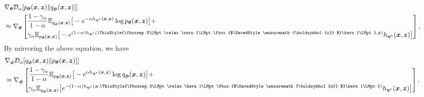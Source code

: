 \documentclass[letterpaper]{article} %
\newcommand{\bali}{\begin{aligned}}
\newcommand{\eali}{\end{aligned}}
\newcommand{\Dc}[0]{\ensuremath{\mathcal{D}} }
\newcommand{\Ebb}[0]{\ensuremath{\mathbb{E}} }
\newcommand{\xv}[0]{\ensuremath{\boldsymbol{x}} }
\newcommand{\zv}[0]{\ensuremath{\boldsymbol{z}} }
\newcommand{\etav}[0]{\ensuremath{\boldsymbol{\eta}} }
\newcommand{\thetav}[0]{\ensuremath{\boldsymbol{\theta}} }
\newcommand{\phiv}[0]{\ensuremath{\boldsymbol{\phi}} }
\newcommand\mathbox[1]{\mathord{\ThisStyle{%
			\fboxsep3\LMpt\relax\kern1\LMpt\fbox{$\SavedStyle#1$}\kern1\LMpt}}}
\begin{document}
\begin{equation}\label{eq:}
\begin{aligned}
    & \nabla_{\thetav} \Dc_{\alpha} [p_{\thetav}(\xv, \zv) \| q_{\phiv}(\xv,\zv)]]
    \\
    & \approx \nabla_{\thetav} \left[
    \bali
        & \frac{1 - \gamma_{\alpha}}{1 - \alpha} \Ebb_{q_{\phiv}(\xv,\zv)} \big[ -
        e^{- \alpha h_{\etav^{*}}(\xv, \zv)}
        \log p_{\thetav}(\xv, \zv)
        \big] + 
        \\
        & \gamma_{\alpha} \Ebb_{p_{\thetav}(\xv, \zv)} \big[-
        e^{(1 - \alpha) h_{\etav^{*}}(\mathbox{\xv}, \zv)}
        h_{\etav^{*}}(\xv, \zv) 
        \big]
    \eali
    \right],
\end{aligned}
\end{equation}
By mirroring the above equation, we have
\begin{equation}\label{eq:}
\begin{aligned}
    & \nabla_{\phiv} \Dc_{\alpha} [q_{\phiv}(\xv,\zv) \| p_{\thetav}(\xv, \zv)]]
    \\
    & \approx \nabla_{\phiv} \left[
    \bali
        & \frac{1 - \gamma_{\alpha}}{1 - \alpha} \Ebb_{p_{\thetav}(\xv, \zv)} \big[ -
        e^{ \alpha h_{\etav^{*}}(\xv, \zv)}
        \log q_{\phiv}(\xv,\zv)
        \big] + 
        \\
        & \gamma_{\alpha} \Ebb_{q_{\phiv}(\xv,\zv)} \big[
        e^{-(1 - \alpha) h_{\etav^{*}}(\xv, \mathbox{\zv})}
        h_{\etav^{*}}(\xv, \zv)
        \big]
    \eali
    \right].
\end{aligned}
\end{equation}
\end{document}
